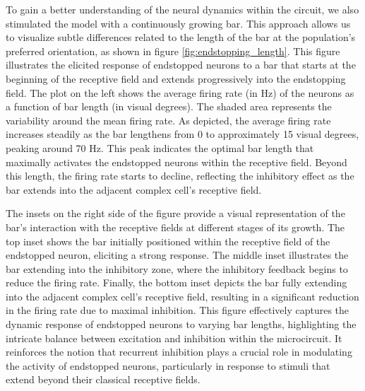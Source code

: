 \documentclass[12pt]{article}
\begin{document}
To gain a better understanding of the neural dynamics within the circuit, we also stimulated the model with a continuously growing bar. This approach allows us to visualize subtle differences related to the length of the bar at the population's preferred orientation, as shown in figure \ref{fig:endstopping_length}. This figure illustrates the elicited response of endstopped neurons to a bar that starts at the beginning of the receptive field and extends progressively into the endstopping field. The plot on the left shows the average firing rate (in Hz) of the neurons as a function of bar length (in visual degrees). The shaded area represents the variability around the mean firing rate. As depicted, the average firing rate increases steadily as the bar lengthens from 0 to approximately 15 visual degrees, peaking around 70 Hz. This peak indicates the optimal bar length that maximally activates the endstopped neurons within the receptive field. Beyond this length, the firing rate starts to decline, reflecting the inhibitory effect as the bar extends into the adjacent complex cell's receptive field.

The insets on the right side of the figure provide a visual representation of the bar's interaction with the receptive fields at different stages of its growth. The top inset shows the bar initially positioned within the receptive field of the endstopped neuron, eliciting a strong response. The middle inset illustrates the bar extending into the inhibitory zone, where the inhibitory feedback begins to reduce the firing rate. Finally, the bottom inset depicts the bar fully extending into the adjacent complex cell's receptive field, resulting in a significant reduction in the firing rate due to maximal inhibition. This figure effectively captures the dynamic response of endstopped neurons to varying bar lengths, highlighting the intricate balance between excitation and inhibition within the microcircuit. It reinforces the notion that recurrent inhibition plays a crucial role in modulating the activity of endstopped neurons, particularly in response to stimuli that extend beyond their classical receptive fields.
\end{document}
